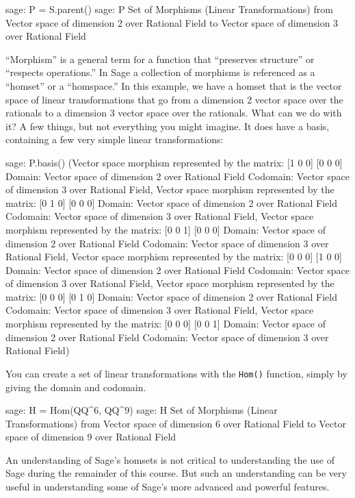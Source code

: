 %
\begin{sageexample}
sage: P = S.parent()
sage: P
Set of Morphisms (Linear Transformations) from
Vector space of dimension 2 over Rational Field to
Vector space of dimension 3 over Rational Field
\end{sageexample}
%
``Morphism'' is a general term for a function that ``preserves structure'' or ``respects operations.''  In Sage a collection of morphisms is referenced as a ``homset'' or a ``homspace.''  In this example, we have a homset that is the vector space of linear transformations that go from a dimension 2 vector space over the rationals to a dimension 3 vector space over the rationals.  What can we do with it?  A few things, but not everything you might imagine.  It does have a basis, containing a few very simple linear transformations:
%
\begin{sageexample}
sage: P.basis()
(Vector space morphism represented by the matrix:
[1 0 0]
[0 0 0]
Domain: Vector space of dimension 2 over Rational Field
Codomain: Vector space of dimension 3 over Rational Field,
Vector space morphism represented by the matrix:
[0 1 0]
[0 0 0]
Domain: Vector space of dimension 2 over Rational Field
Codomain: Vector space of dimension 3 over Rational Field,
Vector space morphism represented by the matrix:
[0 0 1]
[0 0 0]
Domain: Vector space of dimension 2 over Rational Field
Codomain: Vector space of dimension 3 over Rational Field,
Vector space morphism represented by the matrix:
[0 0 0]
[1 0 0]
Domain: Vector space of dimension 2 over Rational Field
Codomain: Vector space of dimension 3 over Rational Field,
Vector space morphism represented by the matrix:
[0 0 0]
[0 1 0]
Domain: Vector space of dimension 2 over Rational Field
Codomain: Vector space of dimension 3 over Rational Field,
Vector space morphism represented by the matrix:
[0 0 0]
[0 0 1]
Domain: Vector space of dimension 2 over Rational Field
Codomain: Vector space of dimension 3 over Rational Field)
\end{sageexample}
%
You can create a set of linear transformations with the \verb?Hom()? function, simply by giving the domain and codomain.
%
\begin{sageexample}
sage: H = Hom(QQ^6, QQ^9)
sage: H
Set of Morphisms (Linear Transformations) from
Vector space of dimension 6 over Rational Field to
Vector space of dimension 9 over Rational Field
\end{sageexample}
%
An understanding of Sage's homsets is not critical to understanding the use of Sage during the remainder of this course.  But such an understanding can be very useful in understanding some of Sage's more advanced and powerful features.
%
\begin{sageverbatim}
\end{sageverbatim}
%
